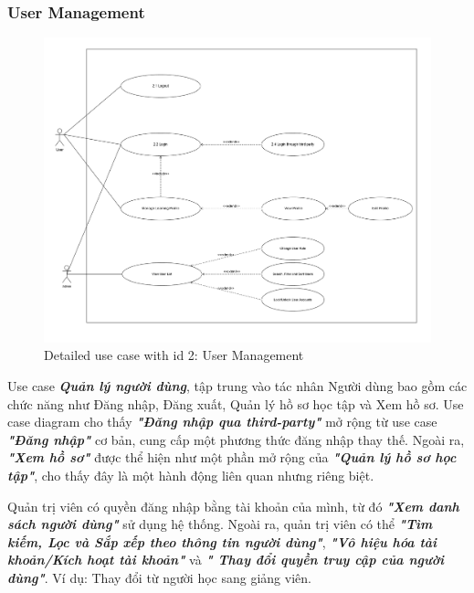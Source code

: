 \subsubsection{User Management}
\begin{figure}[H]
    \centering
    \includegraphics[scale=0.4]{Images/Usecase/usecase-User Management.drawio.png}
    \caption{Detailed use case with id 2: User Management}
    \label{fig:enter-label}
\end{figure}
\quad Use case  \textbf{\textit{Quản lý người dùng}}, tập trung vào tác nhân Người dùng bao gồm các chức năng như Đăng nhập, Đăng xuất, Quản lý hồ sơ học tập và Xem hồ sơ. Use case diagram cho thấy  \textbf{\textit{"Đăng nhập qua third-party"}} mở rộng từ use case  \textbf{\textit{"Đăng nhập"}} cơ bản, cung cấp một phương thức đăng nhập thay thế. Ngoài ra,  \textbf{\textit{"Xem hồ sơ"}} được thể hiện như một phần mở rộng của  \textbf{\textit{"Quản lý hồ sơ học tập"}}, cho thấy đây là một hành động liên quan nhưng riêng biệt. \par Quản trị viên có quyền đăng nhập bằng tài khoản của mình, từ đó \textbf{\textit{"Xem danh sách người dùng"}} sử dụng hệ thống. Ngoài ra, quản trị viên có thể \textbf{\textit{"Tìm kiếm, Lọc và Sắp xếp theo thông tin người dùng"}}, \textbf{\textit{"Vô hiệu hóa tài khoản/Kích hoạt tài khoản"}} và \textbf{\textit{" Thay đổi quyền truy cập của người dùng"}}. Ví dụ: Thay đổi từ người học sang giảng viên. 
